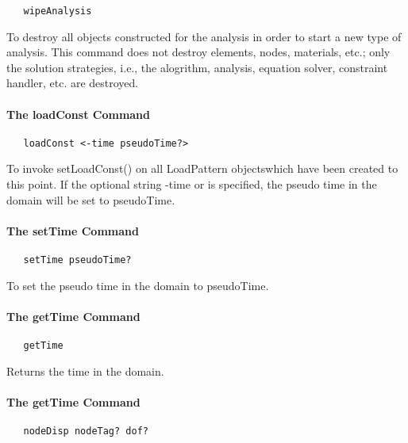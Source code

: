 \documentclass[12pt]{article}
\begin{document}
{\sf\small
\begin{verbatim}
   wipeAnalysis
\end{verbatim}
}

\noindent To destroy all objects constructed for the analysis in order
to start a new type of analysis. This command does not destroy elements,
nodes, materials, etc.; only the solution strategies, i.e., the alogrithm,
analysis, equation solver, constraint handler, etc. are destroyed.

\paragraph {The loadConst Command}

{\sf\small
\begin{verbatim}
   loadConst <-time pseudoTime?>
\end{verbatim}
}

\noindent To invoke setLoadConst() on all LoadPattern objectswhich
have been created to this point. If the optional string -time or
is specified, the pseudo time in the domain will be set to pseudoTime.

\paragraph {The setTime Command}

{\sf\small
\begin{verbatim}
   setTime pseudoTime?
\end{verbatim}
}

\noindent To set the pseudo time in the domain to pseudoTime.

\paragraph {The getTime Command}

{\sf\small
\begin{verbatim}
   getTime
\end{verbatim}
}

\noindent Returns the time in the domain.

\paragraph {The getTime Command}

{\sf\small
\begin{verbatim}
   nodeDisp nodeTag? dof?
\end{verbatim}
}
\end{document}
